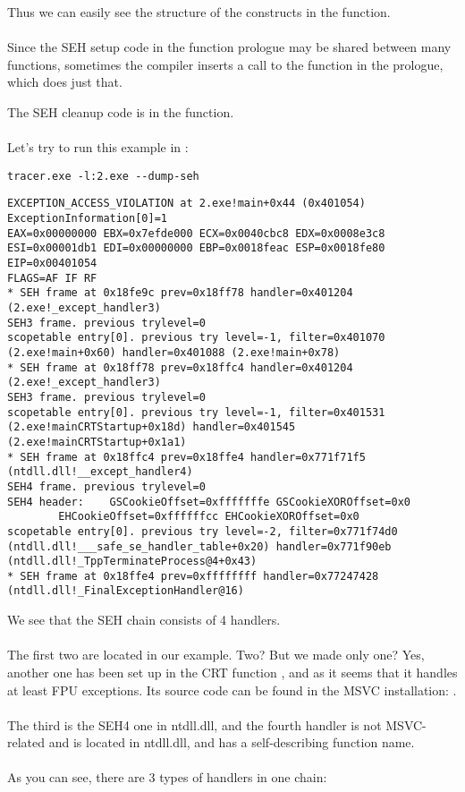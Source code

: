 Thus we can easily see the structure of the  constructs in the function.\\
\\
Since the SEH setup code in the function prologue may be shared between many functions,
sometimes the compiler inserts a call to the  function in the prologue, which does just that.

The SEH cleanup code is in the  function.\\
\\
Let's try to run this example in \tracer{}:

\begin{lstlisting}
tracer.exe -l:2.exe --dump-seh
\end{lstlisting}

\begin{lstlisting}[caption=tracer.exe output]
EXCEPTION_ACCESS_VIOLATION at 2.exe!main+0x44 (0x401054) ExceptionInformation[0]=1
EAX=0x00000000 EBX=0x7efde000 ECX=0x0040cbc8 EDX=0x0008e3c8
ESI=0x00001db1 EDI=0x00000000 EBP=0x0018feac ESP=0x0018fe80
EIP=0x00401054
FLAGS=AF IF RF
* SEH frame at 0x18fe9c prev=0x18ff78 handler=0x401204 (2.exe!_except_handler3)
SEH3 frame. previous trylevel=0
scopetable entry[0]. previous try level=-1, filter=0x401070 (2.exe!main+0x60) handler=0x401088 (2.exe!main+0x78)
* SEH frame at 0x18ff78 prev=0x18ffc4 handler=0x401204 (2.exe!_except_handler3)
SEH3 frame. previous trylevel=0
scopetable entry[0]. previous try level=-1, filter=0x401531 (2.exe!mainCRTStartup+0x18d) handler=0x401545 (2.exe!mainCRTStartup+0x1a1)
* SEH frame at 0x18ffc4 prev=0x18ffe4 handler=0x771f71f5 (ntdll.dll!__except_handler4)
SEH4 frame. previous trylevel=0
SEH4 header:	GSCookieOffset=0xfffffffe GSCookieXOROffset=0x0
		EHCookieOffset=0xffffffcc EHCookieXOROffset=0x0
scopetable entry[0]. previous try level=-2, filter=0x771f74d0 (ntdll.dll!___safe_se_handler_table+0x20) handler=0x771f90eb (ntdll.dll!_TppTerminateProcess@4+0x43)
* SEH frame at 0x18ffe4 prev=0xffffffff handler=0x77247428 (ntdll.dll!_FinalExceptionHandler@16)
\end{lstlisting}

We see that the SEH chain consists of 4 handlers.\\
\\
The first two are located in our example. Two?
But we made only one?
Yes, another one has been set up in the \ac{CRT} function , and as it seems that it handles at least \ac{FPU} exceptions.
Its source code can be found in the MSVC installation: .\\
\\
The third is the SEH4 one in ntdll.dll, 
and the fourth handler is not MSVC-related and is located in ntdll.dll, and has a self-describing function name.\\
\\
As you can see, there are 3 types of handlers in one chain:

